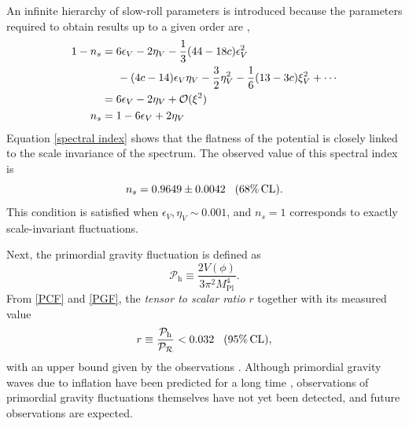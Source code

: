\documentclass[12pt]{article}
\numberwithin{equation}{section}
\begin{document}
An infinite hierarchy of slow-roll parameters is introduced because the parameters required to obtain results up to a given order are \cite{Liddle:1994dx},
\begin{align}\label{spectral index}
    1 - n_s &= 6\epsilon_V - 2\eta_V - \frac{1}{3}(44 - 18c)\epsilon_{V}^2 \notag\\
    &\hspace{0.5cm} - (4c - 14)\epsilon_V \eta_V -\frac{3}{2}\eta_{V}^2 - \frac{1}{6}(13 - 3c)\xi_{V}^2 + \cdots \notag\\
    &= 6\epsilon_V - 2\eta_V + \mathcal{O}(\xi^2) \notag\\
    n_s &= 1 - 6\epsilon_V + 2\eta_V
\end{align}
Equation \eqref{spectral index} shows that the flatness of the potential is closely linked to the scale invariance of the spectrum. The observed value of this spectral index is  \cite{Planck:2018vyg}
\begin{equation}\label{spectral index value}
    n_s = 0.9649 \pm 0.0042\hspace{0.3cm}(68\%\,\textrm{CL}).
\end{equation}
This condition is satisfied when $\epsilon_V, \eta_V \sim 0.001$, and $n_s = 1$ corresponds to exactly scale-invariant fluctuations.\par
Next, the primordial gravity fluctuation is defined as
\begin{equation}\label{PGF}
    \mathcal{P}_{\textrm{h}} \equiv \frac{2V(\phi)}{3\pi^2 M_{\textrm{Pl}}^4}.
\end{equation}
From  \eqref{PCF} and \eqref{PGF}, the \textit{tensor to scalar ratio} $r$ together with its measured value
\begin{equation}\label{tensor to scalar ratio}
    r \equiv \frac{\mathcal{P}_{\textrm{h}}}{\mathcal{P}_{\mathcal{R}}} < 0.032\hspace{0.3cm}(95\%\,\textrm{CL}),
\end{equation}
with an upper bound given by the observations \cite{BICEP:2021xfz}\cite{Tristram:2021tvh}. Although primordial gravity waves due to inflation have been predicted for a long time \cite{Starobinsky:1979ty}, observations of primordial gravity fluctuations themselves have not yet been detected, and future observations are expected.
\end{document}
